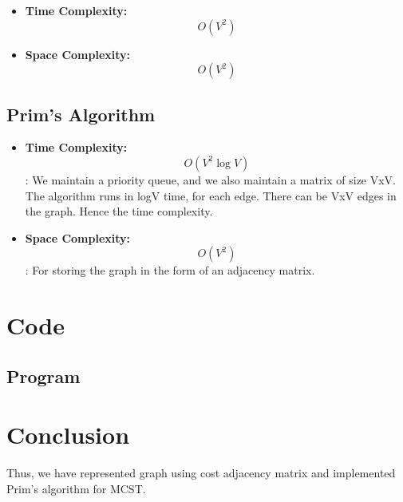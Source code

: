 \documentclass[11pt]{article}
\begin{document}
\begin{itemize}
    \item \textbf{Time Complexity:} \[O(V^2)\]
    \item \textbf{Space Complexity:} \[O(V^2)\]
\end{itemize}

\subsection{Prim's Algorithm}

\begin{itemize}
    \item \textbf{Time Complexity:} \[O(V^2 \log V)\]: We maintain a priority queue, and we also maintain a matrix of size VxV. The algorithm runs in logV time, for each edge. There can be VxV edges in the graph. Hence the time complexity.
    \item \textbf{Space Complexity:} \[O(V^2)\]: For storing the graph in the form of an adjacency matrix.
\end{itemize}

\section{Code}

\subsection{Program}




\section{Conclusion}
Thus, we have represented graph using cost adjacency matrix and implemented Prim's
algorithm for MCST.

\clearpage
\end{document}
